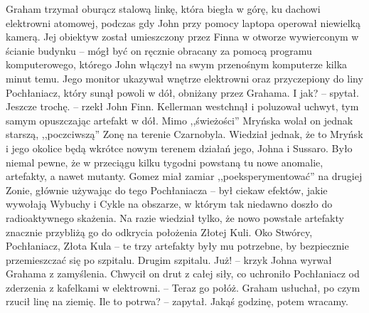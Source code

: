 \documentclass[../MAIN.tex]{subfiles}
\begin{document}
Graham trzymał oburącz stalową linkę, która biegła w górę, ku dachowi elektrowni atomowej, podczas gdy John przy pomocy laptopa operował niewielką kamerą. Jej obiektyw został umieszczony przez Finna w otworze wywierconym w ścianie budynku -- mógł być on ręcznie obracany za pomocą programu komputerowego, którego John włączył na swym przenośnym komputerze kilka minut temu. Jego monitor ukazywał wnętrze elektrowni oraz przyczepiony do liny Pochłaniacz, który sunął powoli w dół, obniżany przez Grahama.
\sx I jak? -- spytał.
\xx Jeszcze trochę. -- rzekł John Finn.
\qd
Kellerman westchnął i poluzował uchwyt, tym samym opuszczając artefakt w dół. Mimo ,,świeżości'' Mryńska wolał on jednak starszą, ,,poczciwszą'' Zonę na terenie Czarnobyla. Wiedział jednak, że to Mryńsk i jego okolice będą wkrótce nowym terenem działań jego, Johna i Sussaro. Było niemal pewne, że w przeciągu kilku tygodni powstaną tu nowe anomalie, artefakty, a nawet mutanty. Gomez miał zamiar ,,poeksperymentować'' na drugiej Zonie, głównie używając do tego Pochłaniacza -- był ciekaw efektów, jakie wywołają Wybuchy i Cykle na obszarze, w którym tak niedawno doszło do radioaktywnego skażenia.
Na razie wiedział tylko, że nowo powstałe artefakty znacznie przybliżą go do odkrycia położenia Złotej Kuli. Oko Stwórcy, Pochłaniacz, Złota Kula -- te trzy artefakty były mu potrzebne, by bezpiecznie przemieszczać się po szpitalu. Drugim szpitalu.
\sx Już! -- krzyk Johna wyrwał Grahama z zamyślenia. Chwycił on drut z całej siły, co uchroniło Pochłaniacz od zderzenia z kafelkami w elektrowni. -- Teraz go połóż.
\qd
Graham usłuchał, po czym rzucił linę na ziemię.
\sx Ile to potrwa? -- zapytał.
\xx Jakąś godzinę, potem wracamy.
\qd
\end{document}

